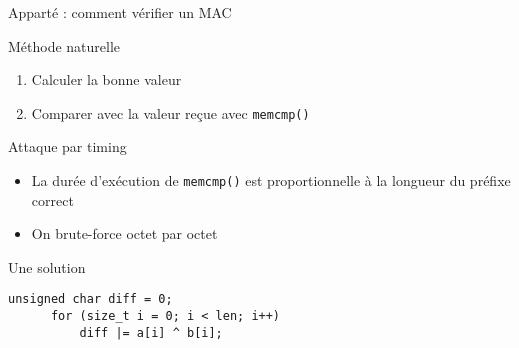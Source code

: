\documentclass{mpg-ep-slides}
\begin{document}
\begin{frame}[containsverbatim]{Apparté : comment vérifier un MAC}
  \begin{block}{Méthode naturelle}
    \begin{enumerate}
      \item Calculer la bonne valeur
      \item Comparer avec la valeur reçue avec \texttt{memcmp()}
    \end{enumerate}
  \end{block}

  \begin{block}{Attaque par timing}
    \begin{itemize}
      \item La durée d'exécution de \texttt{memcmp()} est proportionnelle à la
        longueur du préfixe correct
      \item On brute-force octet par octet
    \end{itemize}
  \end{block}

  \begin{block}{Une solution}
    \begin{Verbatim}[gobble=4]
      unsigned char diff = 0;
      for (size_t i = 0; i < len; i++)
          diff |= a[i] ^ b[i];
    \end{Verbatim}
  \end{block}
\end{frame}
\end{document}
